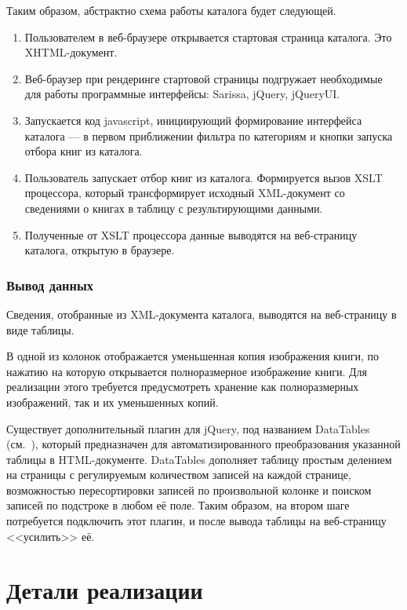 \documentclass[a4paper,14pt,oneside]{extreport}
\begin{document}
Таким образом, абстрактно схема работы каталога будет следующей.
\begin{enumerate}
\item Пользователем в веб-браузере открывается стартовая страница каталога. Это XHTML-документ.
\item Веб-браузер при рендеринге стартовой страницы подгружает необходимые для работы программные интерфейсы: Sarissa, jQuery, jQueryUI.
\item Запускается код javascript, инициирующий формирование интерфейса каталога --- в первом приближении фильтра по категориям и кнопки запуска отбора книг из каталога.
\item Пользователь запускает отбор книг из каталога. Формируется вызов XSLT процессора, который трансформирует исходный XML-документ со сведениями о книгах в таблицу с результирующими данными.
\item Полученные от XSLT процессора данные выводятся на веб-страницу каталога, открытую в браузере.
\end{enumerate}

\subsection{Вывод данных}
Сведения, отобранные из XML-документа каталога, выводятся на веб-страницу в виде таблицы.

В одной из колонок отображается уменьшенная копия изображения книги, по нажатию на которую открывается полноразмерное изображение книги. Для реализации этого требуется предусмотреть хранение как полноразмерных изображений, так и их уменьшенных копий.

Существует дополнительный плагин для jQuery, под названием DataTables (см.~\cite{jQuery-DataTables}), который предназначен для автоматизированного преобразования указанной таблицы в HTML-документе. DataTables дополняет таблицу простым делением на страницы с регулируемым количеством записей на каждой странице, возможностью пересортировки записей по произвольной колонке и поиском записей по подстроке в любом её поле. Таким образом, на втором шаге потребуется подключить этот плагин, и после вывода таблицы на веб-страницу <<усилить>> её.

\chapter{Детали реализации}
\end{document}
